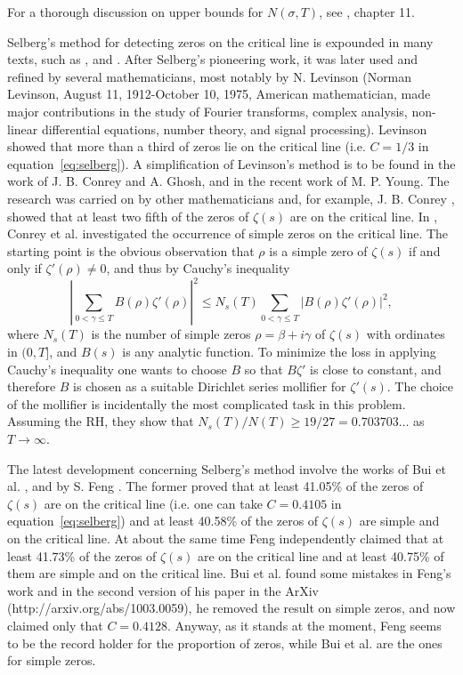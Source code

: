 \documentclass[11pt]{article}
\begin{document}
For a thorough discussion on upper bounds for $N(\sigma, T)$, see \cite{Iv1}, chapter 11.

Selberg's method for detecting zeros on the critical line is expounded in many texts, such as \cite{Tit3}, \cite{Iv1} and \cite{KaVo}. After Selberg's pioneering work, it was later used and refined by several mathematicians, most notably by N. Levinson \cite{Lev} (Norman Levinson, August 11, 1912-October 10, 1975, American mathematician, made major contributions in the study of Fourier transforms, complex analysis, non-linear differential equations, number theory, and signal processing). Levinson showed that more than a third of zeros lie on the critical line (i.e. $C = 1/3$ in equation~\eqref{eq:selberg}). A simplification of Levinson's method is to be found in the work \cite{CoGh2} of J. B. Conrey and A. Ghosh, and in the recent work \cite{You} of M. P. Young. The research was carried on by other mathematicians and, for example, J. B. Conrey \cite{Con2}, showed that at least two fifth of the zeros of $\zeta(s)$ are on the critical line. In \cite{CGG3}, Conrey et al. investigated the occurrence of simple zeros on the critical line. The starting point is the obvious observation that $\rho$ is a simple zero of $\zeta(s)$ if and only if $\zeta'(\rho) \neq 0$, and thus by Cauchy's inequality
\begin{equation}\label{eq:cauchy_simple}
\left|\sum_{0 < \gamma \leq T} B(\rho)\zeta'(\rho)\right|^2 \leq N_s(T) \sum_{0 < \gamma \leq T} |B(\rho)\zeta'(\rho)|^2,
\end{equation}
where $N_s(T)$ is the number of simple zeros $\rho = \beta + i\gamma$ of $\zeta(s)$ with ordinates in $(0, T]$, and $B(s)$ is any analytic function. To minimize the loss in applying Cauchy's inequality one wants to choose $B$ so that $B\zeta'$ is close to constant, and therefore $B$ is chosen as a suitable Dirichlet series mollifier for $\zeta'(s)$. The choice of the mollifier is incidentally the most complicated task in this problem. Assuming the RH, they show that $N_s(T)/N(T) \geq 19/27 = 0.703703\ldots$ as $T \to \infty$.

The latest development concerning Selberg's method involve the works of Bui et al. \cite{BCY}, and by S. Feng \cite{Fen}. The former proved that at least 41.05\% of the zeros of $\zeta(s)$ are on the critical line (i.e. one can take $C = 0.4105$ in equation~\eqref{eq:selberg}) and at least 40.58\% of the zeros of $\zeta(s)$ are simple and on the critical line. At about the same time Feng independently claimed that at least 41.73\% of the zeros of $\zeta(s)$ are on the critical line and at least 40.75\% of them are simple and on the critical line. Bui et al. found some mistakes in Feng's work and in the second version of his paper in the ArXiv (http://arxiv.org/abs/1003.0059), he removed the result on simple zeros, and now claimed only that $C = 0.4128$. Anyway, as it stands at the moment, Feng seems to be the record holder for the proportion of zeros, while Bui et al. are the ones for simple zeros.
\end{document}
